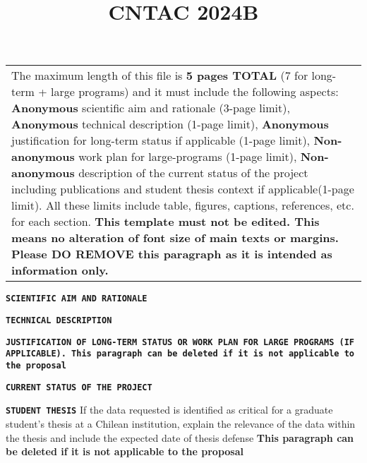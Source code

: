 \documentclass[12pt]{article}
\author{}
\title{CNTAC 2024B}
\begin{document}
{\raggedright

\vspace{3pt} \noindent
\begin{tabular}{|p{514pt}|}
\hline
\parbox{514pt} {\raggedright \vspace{3pt} The maximum length of this
  file is \textbf{5 pages TOTAL} (7 for long-term + large programs)
  and it must include the following aspects: \textbf{Anonymous} scientific aim and
  rationale (3-page limit), \textbf{Anonymous} technical
  description (1-page limit), \textbf{Anonymous} justification for long-term status if
  applicable (1-page limit), \textbf{Non-anonymous} work plan for large-programs (1-page
  limit), \textbf{Non-anonymous} description of the current status of the project including
  publications and student thesis context if applicable(1-page limit). All these limits include table, figures, captions, references, etc. for each section. \textbf{This template must not be edited. This means no
    alteration of font size of main texts or margins. Please DO REMOVE
    this paragraph as it is intended as information only. }} \\ \hline
\end{tabular}
\vspace{2pt}
}

\texttt{\textbf{SCIENTIFIC AIM AND RATIONALE} \\ }

\clearpage
\texttt{\textbf{TECHNICAL DESCRIPTION} \\ }

\clearpage
\texttt{\textbf{JUSTIFICATION OF LONG-TERM STATUS OR WORK PLAN FOR LARGE PROGRAMS (IF APPLICABLE). \textbf{This paragraph can be deleted if it is not applicable to the proposal}} \\ }

\clearpage
\texttt{\textbf{CURRENT STATUS OF THE PROJECT} \\ }

\clearpage
\texttt{\textbf{STUDENT THESIS}}
If the data requested is identified as critical for a graduate student's thesis at a Chilean institution, explain the relevance of the data
within the thesis and include the expected date of thesis defense \textbf{This paragraph can be deleted if it is not applicable to the proposal} \\
\end{document}
